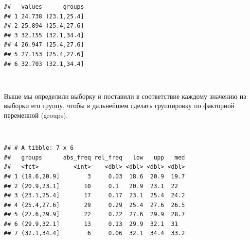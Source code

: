 \documentclass[
  14,
]{article}
\newenvironment{Shaded}{\begin{snugshade}}{\end{snugshade}}
\newcommand{\AttributeTok}[1]{\textcolor[rgb]{0.77,0.63,0.00}{#1}}
\newcommand{\CommentTok}[1]{\textcolor[rgb]{0.56,0.35,0.01}{\textit{#1}}}
\newcommand{\DecValTok}[1]{\textcolor[rgb]{0.00,0.00,0.81}{#1}}
\newcommand{\FunctionTok}[1]{\textcolor[rgb]{0.00,0.00,0.00}{#1}}
\newcommand{\NormalTok}[1]{#1}
\newcommand{\OtherTok}[1]{\textcolor[rgb]{0.56,0.35,0.01}{#1}}
\newcommand{\SpecialCharTok}[1]{\textcolor[rgb]{0.00,0.00,0.00}{#1}}
\begin{document}
\begin{verbatim}
##   values      groups
## 1 24.738 (23.1,25.4]
## 2 25.894 (25.4,27.6]
## 3 32.155 (32.1,34.4]
## 4 26.947 (25.4,27.6]
## 5 27.153 (25.4,27.6]
## 6 32.703 (32.1,34.4]
\end{verbatim}

\(\ \)

Выше мы определили выборку и поставили в соответствие каждому значению
из выборки его группу, чтобы в дальнейшем сделать группировку по
факторной переменной (groups).

\(\ \)

\begin{Shaded}
\end{Shaded}

\begin{verbatim}
## # A tibble: 7 x 6
##   groups      abs_freq rel_freq   low   upp   med
##   <fct>          <int>    <dbl> <dbl> <dbl> <dbl>
## 1 (18.6,20.9]        3     0.03  18.6  20.9  19.7
## 2 (20.9,23.1]       10     0.1   20.9  23.1  22  
## 3 (23.1,25.4]       17     0.17  23.1  25.4  24.2
## 4 (25.4,27.6]       29     0.29  25.4  27.6  26.5
## 5 (27.6,29.9]       22     0.22  27.6  29.9  28.7
## 6 (29.9,32.1]       13     0.13  29.9  32.1  31  
## 7 (32.1,34.4]        6     0.06  32.1  34.4  33.2
\end{verbatim}
\end{document}
